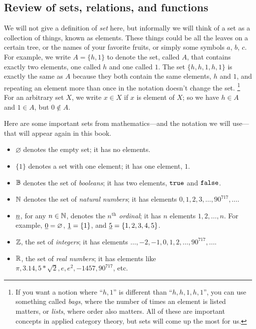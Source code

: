 \documentclass[7Sketches]{subfiles}
\begin{document}
\subsection{Review of sets, relations, and functions}%
\label{sec.sets_and_rels}%

We will not give a definition of \emph{set} here, but informally we will think of a set as
a collection of things, known as elements. These things could be all the leaves
on a certain tree, or the names of your favorite fruits, or simply some symbols $a$,
$b$, $c$. For example, we write $A=\{h,1\}$ to denote the set, called $A$, that
contains exactly two elements, one called $h$ and one called $1$. The set $\{h,h,1,h,1\}$ is exactly the same as $A$ because they both contain the same elements, $h$ and $1$, and repeating an element more than once in the notation doesn't change the set.%
\footnote{If you want a notion where ``$h,1$'' is different than ``$h,h,1,h,1$'', you can use something called \emph{bags}, where the number of times an element is listed matters, or \emph{lists}, where order also matters. All of these are important concepts in applied category theory, but sets will come up the most for us.}
For an arbitrary set $X$, we write $x \in X$ if $x$ is
element of $X$; so we have $h\in A$ and $1\in A$, but $0\not\in A$.

\begin{example}
Here are some important sets from mathematics---and the notation we will use---that will appear again in this book.%
\begin{itemize}
	\item $\varnothing$ denotes the empty set; it has no elements.%
	\item $\{1\}$ denotes a set with one element; it has one element, $1$.%
	\item $\mathbb{B}$ denotes the set of \emph{booleans}; it has two elements, $\mathtt{true}$ and $\mathtt{false}$.%
%
	\item $\mathbb{N}$ denotes the set of \emph{natural numbers}; it has elements $0,1,2,3,\ldots,90^{717},\ldots$.%
	\item $\underline{{n}}$, for any $n\in\mathbb{N}$, denotes the \emph{$n^{\text{th}}$ ordinal}; it has $n$ elements $1,2,\ldots,n$. For example, $\underline{{0}}=\varnothing$, $\underline{{1}}=\{1\}$, and $\underline{{5}}=\{1,2,3,4,5\}$.%
	\item $\mathbb{Z}$, the set of \emph{integers}; it has elements $\ldots,-2,-1,0,1,2,\ldots,90^{717},\ldots$.%
	\item $\mathbb{R}$, the set of \emph{real numbers}; it has elements like $\pi, 3.14, 5*\sqrt{2}, e, e^2, -1457, 90^{717}$, etc.%
%
\end{itemize}
\end{example}
\end{document}
